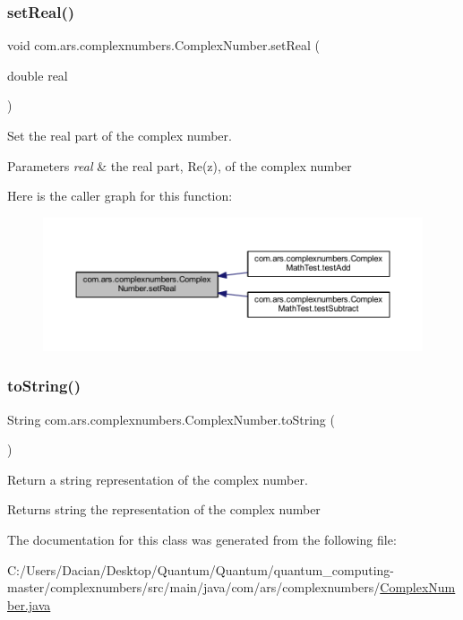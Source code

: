 \subsubsection{\texorpdfstring{set\+Real()}{setReal()}}
{\footnotesize\ttfamily void com.\+ars.\+complexnumbers.\+Complex\+Number.\+set\+Real (\begin{DoxyParamCaption}\item[{double}]{real }\end{DoxyParamCaption})}

Set the real part of the complex number. 
\begin{DoxyParams}{Parameters}
{\em real} & the real part, Re(z), of the complex number \\
\hline
\end{DoxyParams}
Here is the caller graph for this function\+:
\nopagebreak
\begin{figure}[H]
\begin{center}
\leavevmode
\includegraphics[width=350pt]{classcom_1_1ars_1_1complexnumbers_1_1_complex_number_ae13ab597ac2208a3915398ee075a7b69_icgraph}
\end{center}
\end{figure}
\hypertarget{classcom_1_1ars_1_1complexnumbers_1_1_complex_number_ab55fe26ece82d837fc4db3ab88577aa0}{}\label{classcom_1_1ars_1_1complexnumbers_1_1_complex_number_ab55fe26ece82d837fc4db3ab88577aa0} 
\subsubsection{\texorpdfstring{to\+String()}{toString()}}
{\footnotesize\ttfamily String com.\+ars.\+complexnumbers.\+Complex\+Number.\+to\+String (\begin{DoxyParamCaption}{ }\end{DoxyParamCaption})}

Return a string representation of the complex number. \begin{DoxyReturn}{Returns}
string the representation of the complex number 
\end{DoxyReturn}


The documentation for this class was generated from the following file\+:\begin{DoxyCompactItemize}
\item 
C\+:/\+Users/\+Dacian/\+Desktop/\+Quantum/\+Quantum/quantum\+\_\+computing-\/master/complexnumbers/src/main/java/com/ars/complexnumbers/\hyperlink{_complex_number_8java}{Complex\+Number.\+java}\end{DoxyCompactItemize}

